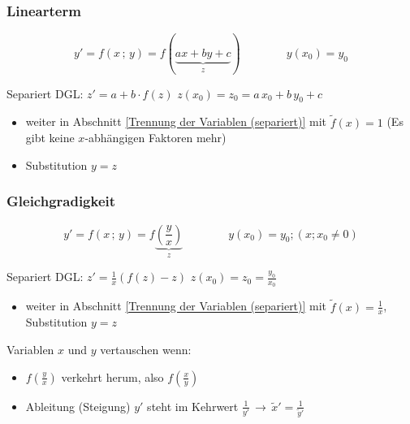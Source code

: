 \subsubsection{Linearterm}

\vspace{-0.2cm}

$$ y' = f(x \, ; \, y) = f( \underbrace{ax + by +c}_{\substack{z}}) \qquad \qquad y(x_0) = y_0 $$\vspace{-1em}

Separiert DGL: \quad $\boxed{z' = a + b \cdot f(z)}$ \qquad \qquad $z(x_0) = z_0 = a  \,x_0 + b \, y_0 + c$ 

\smallskip
\begin{itemize}
    \item weiter in Abschnitt \ref{Trennung der Variablen (separiert)} 
    mit $\tilde{f}(x) = 1$ (Es gibt keine $x$-abhängigen Faktoren mehr)
    \item Substitution $y = z$
\end{itemize}

\subsubsection{Gleichgradigkeit}\vspace{-0.2cm}

$$ y' = f(x \, ; \, y) = f \underbrace{\left(\frac{y}{x}\right)}_z \qquad \qquad y(x_0) = y_0 ; (x ; x_0 \neq 0) $$\vspace{-0.5em}

Separiert DGL: \quad $\boxed{z' = \frac{1}{x} (f(z) - z)}$ \qquad \qquad $z(x_0) = z_0 = \frac{y_0}{x_0}$ 

\begin{itemize}
    \item weiter in Abschnitt \ref{Trennung der Variablen (separiert)} mit $\tilde{f}(x) = \frac{1}{x}$, Substitution $y = z$ 
\end{itemize}

\medskip


Variablen $x$ und $y$ vertauschen wenn:

\smallskip

\begin{itemize}
    \item $f(\frac{y}{x})$ verkehrt herum, also $f(\frac{x}{y})$
    \item Ableitung (Steigung) $y'$ steht im Kehrwert $\frac{1}{y'} \, \longrightarrow \, \tilde{x}' = \frac{1}{\tilde{y}'}$
\end{itemize}


